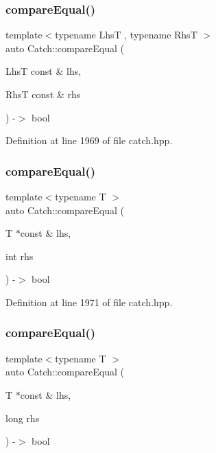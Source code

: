 \subsubsection{compareEqual()\hspace{0.1cm}{\footnotesize\ttfamily [1/5]}}
{\footnotesize\ttfamily template$<$typename LhsT , typename RhsT $>$ \\
auto Catch\+::compare\+Equal (\begin{DoxyParamCaption}\item[{LhsT const \&}]{lhs,  }\item[{RhsT const \&}]{rhs }\end{DoxyParamCaption}) -\/$>$ bool }



Definition at line 1969 of file catch.\+hpp.

\mbox{\label{namespace_catch_a68f451c45e65f242dde5f21c19a4cf7a}} 
\subsubsection{compareEqual()\hspace{0.1cm}{\footnotesize\ttfamily [2/5]}}
{\footnotesize\ttfamily template$<$typename T $>$ \\
auto Catch\+::compare\+Equal (\begin{DoxyParamCaption}\item[{T $\ast$const \&}]{lhs,  }\item[{int}]{rhs }\end{DoxyParamCaption}) -\/$>$ bool }



Definition at line 1971 of file catch.\+hpp.

\mbox{\label{namespace_catch_afca4a005e1053c542462dc7a603b41b3}} 
\subsubsection{compareEqual()\hspace{0.1cm}{\footnotesize\ttfamily [3/5]}}
{\footnotesize\ttfamily template$<$typename T $>$ \\
auto Catch\+::compare\+Equal (\begin{DoxyParamCaption}\item[{T $\ast$const \&}]{lhs,  }\item[{long}]{rhs }\end{DoxyParamCaption}) -\/$>$ bool }



